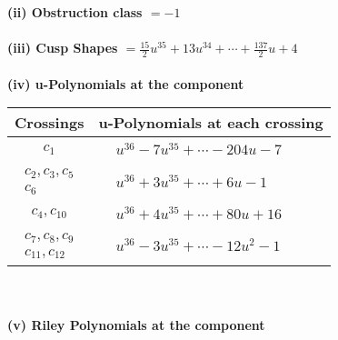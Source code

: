 \documentclass[1p]{elsarticle_modified}
\theoremstyle{definition}
\begin{document}
\flushleft \textbf{(ii) Obstruction class $= -1$}\\~\\
\flushleft \textbf{(iii) Cusp Shapes $= \frac{15}{2} u^{35}+13 u^{34}+\cdots+\frac{137}{2} u+4$}\\~\\
\newpage\renewcommand{\arraystretch}{1}
\flushleft \textbf{(iv) u-Polynomials at the component}\newline \\
\begin{tabular}{m{50pt}|m{274pt}}
Crossings & \hspace{64pt}u-Polynomials at each crossing \\
\hline $$\begin{aligned}c_{1}\end{aligned}$$&$\begin{aligned}
&u^{36}-7 u^{35}+\cdots-204 u-7
\end{aligned}$\\
\hline $$\begin{aligned}c_{2},c_{3},c_{5}\\c_{6}\end{aligned}$$&$\begin{aligned}
&u^{36}+3 u^{35}+\cdots+6 u-1
\end{aligned}$\\
\hline $$\begin{aligned}c_{4},c_{10}\end{aligned}$$&$\begin{aligned}
&u^{36}+4 u^{35}+\cdots+80 u+16
\end{aligned}$\\
\hline $$\begin{aligned}c_{7},c_{8},c_{9}\\c_{11},c_{12}\end{aligned}$$&$\begin{aligned}
&u^{36}-3 u^{35}+\cdots-12 u^2-1
\end{aligned}$\\
\hline
\end{tabular}\\~\\
\newpage\renewcommand{\arraystretch}{1}
\flushleft \textbf{(v) Riley Polynomials at the component}\newline \\
\end{document}
